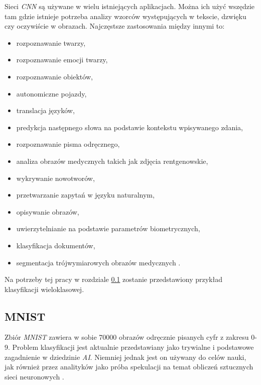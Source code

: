\documentclass[a4paper,12pt,oneside]{book} %
\begin{document}
Sieci \emph{CNN} są używane w wielu istniejących aplikacjach. Można ich użyć wszędzie tam gdzie istnieje potrzeba analizy wzorców występujących w tekscie, dzwięku czy oczywiście w obrazach. Najczęstsze zastosowania między innymi to:
\begin{itemize}
	\item rozpoznawanie twarzy,
	\item rozpoznawanie emocji twarzy,
	\item rozpoznawanie obiektów,
	\item autonomiczne pojazdy,
	\item translacja języków,
	\item predykcja następnego słowa na podstawie kontekstu wpisywanego zdania,
	\item rozpoznawanie pisma odręcznego,
	\item analiza obrazów medycznych takich jak zdjęcia rentgenowskie,
	\item wykrywanie nowotworów,
	\item przetwarzanie zapytań w języku naturalnym,
	\item opisywanie obrazów,
	\item uwierzytelnianie na podstawie parametrów biometrycznych,
	\item klasyfikacja dokumentów,
	\item segmentacja trójwymiarowych obrazów medycznych \cite{cnnapps}.
\end{itemize}

Na potrzeby tej pracy w rozdziale \ref{mnist} zostanie przedstawiony przykład klasyfikacji wieloklasowej.

\subsection{MNIST}
\label{mnist}
Zbiór \emph{MNIST} zawiera w sobie 70000 obrazów odręcznie pisanych cyfr z zakresu 0-9. Problem klasyfikacji jest aktualnie przedstawiany jako trywialne i podstawowe zagadnienie w dziedzinie \emph{AI}. Niemniej jednak jest on używany do celów nauki, jak również przez analityków jako próba spekulacji na temat obliczeń sztucznych sieci neuronowych \cite{9388351}. 
\end{document}
